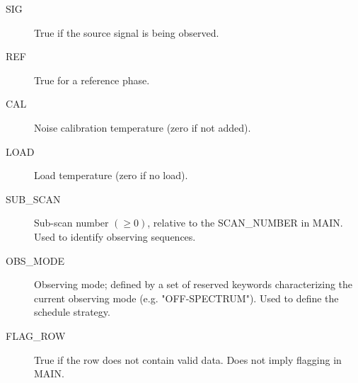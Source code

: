 \documentclass{article}
\begin{document}
\begin{itemize}
\begin{description}
\item[SIG] True if the source signal is being observed.

\item[REF] True for a reference phase.

\item[CAL] Noise calibration temperature (zero if not added).

\item[LOAD] Load temperature (zero if no load).

\item[SUB\_SCAN] Sub-scan number $(\geq 0)$, relative to the
SCAN\_NUMBER in MAIN. Used to identify observing sequences.

\item[OBS\_MODE] Observing mode; defined by a set of reserved keywords
characterizing the current observing mode (e.g. "OFF-SPECTRUM"). Used
to define the schedule strategy.

\item[FLAG\_ROW] True if the row does not contain valid data. Does not
imply flagging in MAIN.

\end{description}


\end{itemize}
\end{document}
